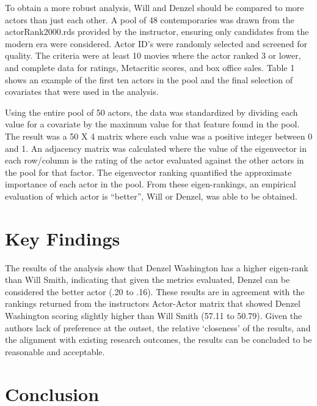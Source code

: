 \documentclass[]{article}
\begin{document}
To obtain a more robust analysis, Will and Denzel should be compared to
more actors than just each other. A pool of 48 contemporaries was drawn
from the actorRank2000.rds provided by the instructor, ensuring only
candidates from the modern era were considered. Actor ID's were randomly
selected and screened for quality. The criteria were at least 10 movies
where the actor ranked 3 or lower, and complete data for ratings,
Metacritic scores, and box office sales. Table 1 shows an example of the
first ten actors in the pool and the final selection of covariates that
were used in the analysis. \newline



Using the entire pool of 50 actors, the data was standardized by
dividing each value for a covariate by the maximum value for that
feature found in the pool. The result was a 50 X 4 matrix where each
value was a positive integer between 0 and 1. An adjacency matrix was
calculated where the value of the eigenvector in each row/column is the
rating of the actor evaluated against the other actors in the pool for
that factor. The eigenvector ranking quantified the approximate
importance of each actor in the pool. From these eigen-rankings, an
empirical evaluation of which actor is ``better'', Will or Denzel, was
able to be obtained. \newline

\section{Key Findings}
\label{sec:findings}



The results of the analysis show that Denzel Washington has a higher
eigen-rank than Will Smith, indicating that given the metrics evaluated,
Denzel can be considered the better actor (.20 to .16). These results
are in agreement with the rankings returned from the instructors
Actor-Actor matrix that showed Denzel Washington scoring slightly higher
than Will Smith (57.11 to 50.79). Given the authors lack of preference
at the outset, the relative `closeness' of the results, and the
alignment with existing research outcomes, the results can be concluded
to be reasonable and acceptable.

\section{Conclusion}
\label{sec:conclusion}
\end{document}

